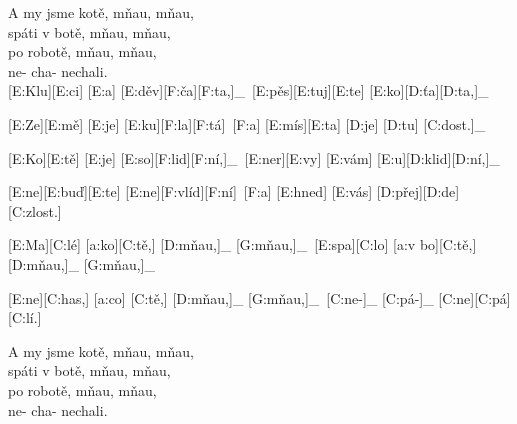 A my jsme kotě, mňau, mňau,\\
spáti v botě, mňau, mňau,\\
po robotě, mňau, mňau,\\
ne- cha- nechali.\\

[E:Klu][E:ci] [E:a] [E:děv][F:ča][F:ta,]_\
[E:pěs][E:tuj][E:te] [E:ko][D:ťa][D:ta,]_\

[E:Ze][E:mě] [E:je] [E:ku][F:la][F:tá]\
[F:a] [E:mís][E:ta] [D:je] [D:tu] [C:dost.]_\

[E:Ko][E:tě] [E:je] [E:so][F:lid][F:ní,]_\
[E:ner][E:vy] [E:vám] [E:u][D:klid][D:ní,]_\

[E:ne][E:buď][E:te] [E:ne][F:vlíd][F:ní]\
[F:a] [E:hned] [E:vás] [D:přej][D:de] [C:zlost.]\

[E:Ma][C:lé] [a:ko][C:tě,] [D:mňau,]_ [G:mňau,]_\
[E:spa][C:lo] [a:v bo][C:tě,] [D:mňau,]_ [G:mňau,]_\

[E:ne][C:has,] [a:co] [C:tě,] [D:mňau,]_ [G:mňau,]_\
[C:ne-]_ [C:pá-]_ [C:ne][C:pá][C:lí.]\

A my jsme kotě, mňau, mňau,\\
spáti v botě, mňau, mňau,\\
po robotě, mňau, mňau,\\
ne- cha- nechali.\\

\bye

